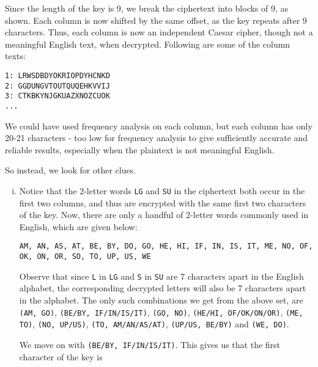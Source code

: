 \documentclass[11pt]{article}
\begin{document}
\begin{enumerate}
\begin{minipage}{0.75\linewidth}
    Since the length of the key is 9, we break the ciphertext into blocks of 9, as shown. Each column is now shifted by the same offset, as the key repeats after 9 characters. Thus, each column is now an independent Caesar cipher, though not a meaningful English text, when decrypted. Following are some of the column texts:
    \medskip

    \begin{center}
      \texttt{1: LRWSDBDYOKRIOPDYHCNKD}\\
    \texttt{2: GGDUNGVTOUTQUQEHKVVIJ}\\
    \texttt{3: CTKBKYNJGKUAZXNOZCUOK}\\
    \texttt{...}
    \end{center}

    We could have used frequency analysis on each column, but each column has only 20-21 characters - too low for frequency analysis to give sufficiently accurate and reliable results, especially when the plaintext is not meaningful English.
  \end{minipage}

  \pagebreak

  So instead, we look for other clues.

  \begin{enumerate}[i.]
    \item Notice that the 2-letter words \texttt{LG} and \texttt{SU} in the ciphertext both occur in the first two columns, and thus are encrypted with the same first two characters of the key. Now, there are only a handful of 2-letter words commonly used in English, which are given below: 
    
    \begin{center}
      \texttt{AM, AN, AS, AT, BE, BY, DO, GO, HE, HI, IF, IN, IS, IT, ME, NO, OF, OK, ON, OR, SO, TO, UP, US, WE}
    \end{center}

    Observe that since \texttt{L} in \texttt{LG} and \texttt{S} in \texttt{SU} are 7 characters apart in the English alphabet, the corresponding decrypted letters will also be 7 characters apart in the alphabet. The only such combinations we get from the above set, are \texttt{(AM, GO)}, \texttt{(BE/BY, IF/IN/IS/IT)}, \texttt{(GO, NO)}, \texttt{(HE/HI, OF/OK/ON/OR)}, \texttt{(ME, TO)}, \texttt{(NO, UP/US)}, \texttt{(TO, AM/AN/AS/AT)}, \texttt{(UP/US, BE/BY)} and \texttt{(WE, DO)}. 

    We move on with \texttt{(BE/BY, IF/IN/IS/IT)}. This gives us that the first character of the key is 
    

\end{enumerate}
\end{enumerate}
\end{document}
